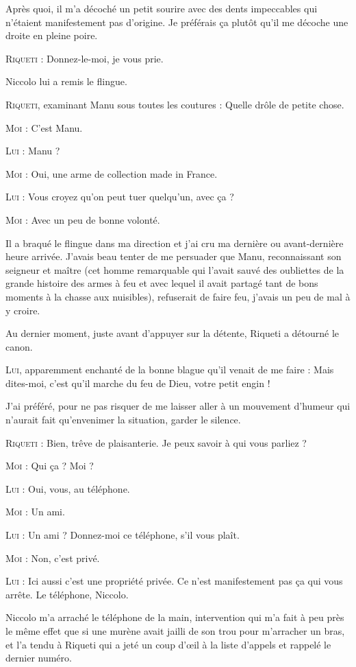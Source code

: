 Après quoi, il m’a décoché un petit sourire avec des dents impeccables qui n’étaient manifestement pas d’origine. Je préférais ça plutôt qu’il me décoche une droite en pleine poire.

\textsc{Riqueti} : Donnez-le-moi, je vous prie.

Niccolo lui a remis le flingue.

\textsc{Riqueti}, examinant Manu sous toutes les coutures : Quelle drôle de petite chose.

\textsc{Moi} : C’est Manu.

\textsc{Lui} : Manu ?

\textsc{Moi} : Oui, une arme de collection made in France.

\textsc{Lui} : Vous croyez qu’on peut tuer quelqu’un, avec ça ?

\textsc{Moi} : Avec un peu de bonne volonté.

Il a braqué le flingue dans ma direction et j’ai cru ma dernière ou avant-dernière heure arrivée. J’avais beau tenter de me persuader que Manu, reconnaissant son seigneur et maître (cet homme remarquable qui l’avait sauvé des oubliettes de la grande histoire des armes à feu et avec lequel il avait partagé tant de bons moments à la chasse aux nuisibles), refuserait de faire feu, j’avais un peu de mal à y croire.

Au dernier moment, juste avant d’appuyer sur la détente, Riqueti a détourné le canon.

\textsc{Lui}, apparemment enchanté de la bonne blague qu’il venait de me faire : Mais dites-moi, c’est qu’il marche du feu de Dieu, votre petit engin !

J’ai préféré, pour ne pas risquer de me laisser aller à un mouvement d’humeur qui n’aurait fait qu’envenimer la situation, garder le silence.

\textsc{Riqueti} : Bien, trêve de plaisanterie. Je peux savoir à qui vous parliez ?

\textsc{Moi} : Qui ça ? Moi ?

\textsc{Lui} : Oui, vous, au téléphone.

\textsc{Moi} : Un ami.

\textsc{Lui} : Un ami ? Donnez-moi ce téléphone, s’il vous plaît.

\textsc{Moi} : Non, c’est privé.

\textsc{Lui} : Ici aussi c’est une propriété privée. Ce n’est manifestement pas ça qui vous arrête. Le téléphone, Niccolo.

Niccolo m’a arraché le téléphone de la main, intervention qui m’a fait à peu près le même effet que si une murène avait jailli de son trou pour m’arracher un bras, et l’a tendu à Riqueti qui a jeté un coup d’œil à la liste d’appels et rappelé le dernier numéro.


